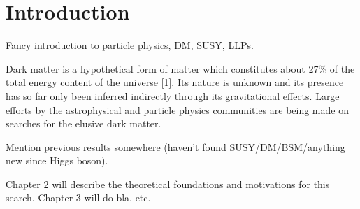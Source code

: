 \chapter{Introduction}
\label{chap:introduction}



Fancy introduction to particle physics, DM, SUSY, LLPs.

Dark matter is a hypothetical form of matter which constitutes about 27\% of 
the total energy content of the universe [1]. Its nature is unknown and its 
presence has so far only been inferred indirectly through its gravitational 
effects. Large efforts by the astrophysical and particle physics communities 
are 
being made on searches for the elusive dark matter.

Mention previous results somewhere (haven't found SUSY/DM/BSM/anything new 
since Higgs boson).

Chapter 2 will describe 
the theoretical foundations and motivations for this search. Chapter 3 will do 
bla, etc.


